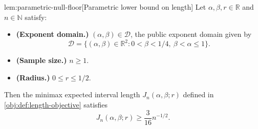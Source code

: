 \documentclass[11pt]{article}
\begin{document}
\begin{lemmav}{lem:parametric-null-floor}[Parametric lower bound on length]
Let \(\alpha,\beta,r\in\mathbb R\) and \(n\in\mathbb N\) satisfy:
\begin{itemize}
\item \textbf{(Exponent domain.)} \((\alpha,\beta)\in\mathcal D\), the public exponent domain given by
\[
\mathcal D=\{(\alpha,\beta)\in\mathbb R^2:0<\beta<1/4,\ \beta<\alpha\le1\}.
\]
\item \textbf{(Sample size.)} \(n\ge1\).
\item \textbf{(Radius.)} \(0\le r\le1/2\).
\end{itemize}
Then the minimax expected interval length \(J_n(\alpha,\beta;r)\) defined in \cref{obj:def:length-objective} satisfies
\[
J_n(\alpha,\beta;r)\ge \frac{3}{16}n^{-1/2}.
\]
\end{lemmav}
\end{document}
